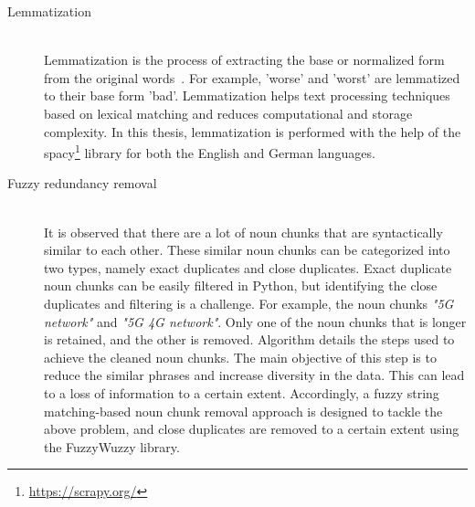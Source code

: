 \begin{description}
 	
 	\item[Lemmatization] \hfill \\  Lemmatization is the process of extracting the base or normalized form from the original words~\cite{plisson2004rule}. For example, 'worse' and 'worst' are lemmatized to their base form 'bad'. Lemmatization helps text processing techniques based on lexical matching and reduces computational and storage complexity. In this thesis, lemmatization is performed with the help of the spacy\footnote{\url{https://scrapy.org/}} library for both the English and German languages.
 	
 	
 	\item[Fuzzy redundancy removal] \hfill \\  It is observed that there are a lot of noun chunks that are syntactically similar to each other. These similar noun chunks can be categorized into two types, namely exact duplicates and close duplicates. Exact duplicate noun chunks can be easily filtered in Python, but identifying the close duplicates and filtering is a challenge. For example, the noun chunks \textit{"5G network"} and \textit{"5G 4G network"}. Only one of the noun chunks that is longer is retained, and the other is removed. Algorithm  details the steps used to achieve the cleaned noun chunks. The main objective of this step is to reduce the similar phrases and increase diversity in the data. This can lead to a loss of information to a certain extent. Accordingly, a fuzzy string matching-based noun chunk removal approach is designed to tackle the above problem, and close duplicates are removed to a certain extent using the FuzzyWuzzy library.
 	
 	
 \end{description}

